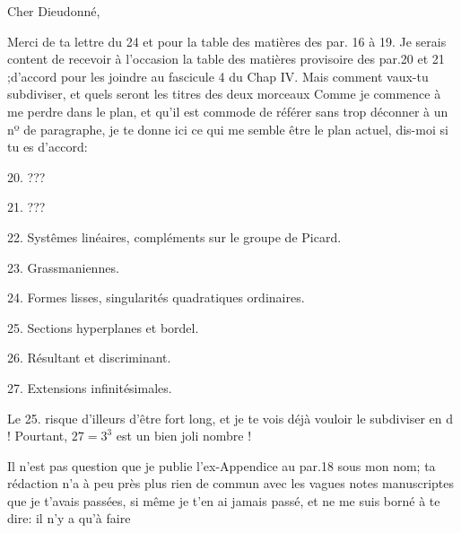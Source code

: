 

Cher Dieudonné,

Merci de ta lettre du 24  et pour la table des matières des par.
16 à 19.  Je serais content de recevoir à l'occasion la table des
matières provisoire des par.20 et 21 ;d'accord pour les joindre au
fascicule 4 du Chap IV. Mais comment vaux-tu  subdiviser, et
quels seront les titres des deux morceaux  Comme je commence à me
perdre dans le plan, et qu'il est  commode de  référer
sans trop déconner à un nº de paragraphe, je te donne ici ce qui me
semble être le plan actuel, dis-moi si tu es d'accord:

20.  ???

21.  ???

22.  Systêmes linéaires, compléments sur le groupe de Picard.

23.  Grassmaniennes.

24.  Formes lisses, singularités quadratiques ordinaires.

25.  Sections hyperplanes et bordel.

26.  Résultant et discriminant.

27.  Extensions infinitésimales.

Le 25.  risque d'illeurs d'être fort long, et je te vois déjà
vouloir le subdiviser en d !  Pourtant, $27=3^3$ est un bien joli
nombre !

Il n'est pas question que je publie l'ex-Appendice au par.18
sous mon nom; ta rédaction n'a à peu près plus rien de commun avec
les vagues notes manuscriptes que je t'avais passées, si même je t'en
ai jamais passé, et ne me suis borné à te dire: il n'y a qu'à faire

